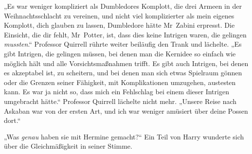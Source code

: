 „Es war weniger kompliziert als Dumbledores Komplott, die drei Armeen in der Weihnachtsschlacht zu vereinen, und nicht viel komplizierter als mein eigenes Komplott, dich glauben zu lassen, Dumbledore hätte Mr~Zabini erpresst. Die Einsicht, die dir fehlt, Mr~Potter, ist, dass dies keine Intrigen waren, die gelingen \emph{mussten}.“
Professor Quirrell rührte weiter beiläufig den Trank und lächelte.
„Es gibt Intrigen, die gelingen müssen, bei denen man die Kernidee so einfach wie möglich hält und alle Vorsichtsmaßnahmen trifft. Es gibt auch Intrigen, bei denen es akzeptabel ist, zu scheitern, und bei denen man sich etwas Spielraum gönnen oder die Grenzen seiner Fähigkeit, mit Komplikationen umzugehen, austesten kann. Es war ja nicht so, dass mich ein Fehlschlag bei einem dieser Intrigen umgebracht hätte.“
Professor Quirrell lächelte nicht mehr.
„Unsere Reise nach Askaban war von der ersten Art, und ich war weniger amüsiert über deine Possen dort.“

„Was \emph{genau} haben sie mit Hermine gemacht?“
Ein Teil von Harry wunderte sich über die Gleichmäßigkeit in seiner Stimme.

